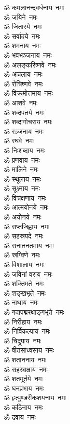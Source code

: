\begin{multicols}{2}
\begin{flushleft}
ॐ कमलानन्दवर्धनाय~नमः\\
ॐ जयिने~नमः\hfill{}\\
ॐ जितारये~नमः\\
ॐ सर्वादये~नमः\\
ॐ शमनाय~नमः\\
ॐ भवभञ्जनाय~नमः\\
ॐ अलङ्करिष्णवे~नमः\\
ॐ अचलाय~नमः\\
ॐ रोचिष्णवे~नमः\\
ॐ विक्रमोत्तमाय~नमः\\
ॐ आशवे~नमः\\
ॐ शब्दपतये~नमः\hfill{}\\
ॐ शब्दागोचराय~नमः\\
ॐ रञ्जनाय~नमः\\
ॐ रघवे~नमः\\
ॐ निःशब्दाय~नमः\\
ॐ प्रणवाय~नमः\\
ॐ मालिने~नमः\\
ॐ स्थूलाय~नमः\\
ॐ सूक्ष्माय~नमः\\
ॐ विचक्षणाय~नमः\\
ॐ आत्मयोनये~नमः\hfill{}\\
ॐ अयोनये~नमः\\
ॐ सप्तजिह्वाय~नमः\\
ॐ सहस्रपदे~नमः\\
ॐ सनातनतमाय~नमः\\
ॐ स्रग्विणे~नमः\\
ॐ विशालाय~नमः\\
ॐ जविनां वराय~नमः\\
ॐ शक्तिमते~नमः\\
ॐ शङ्खभृते~नमः\\
ॐ नाथाय~नमः\hfill{}\\
ॐ गदापद्मरथाङ्गभृते~नमः\\
ॐ निरीहाय~नमः\\
ॐ निर्विकल्पाय~नमः\\
ॐ चिद्रूपाय~नमः\\
ॐ वीतसाध्वसाय~नमः\\
ॐ शताननाय~नमः\\
ॐ सहस्राक्षाय~नमः\\
ॐ शतमूर्तये~नमः\\
ॐ घनप्रभाय~नमः\\
ॐ हृत्पुण्डरीकशयनाय~नमः\hfill{}\\
ॐ कठिनाय~नमः\\
ॐ द्रवाय~नमः\\

\end{flushleft}
\end{multicols}

